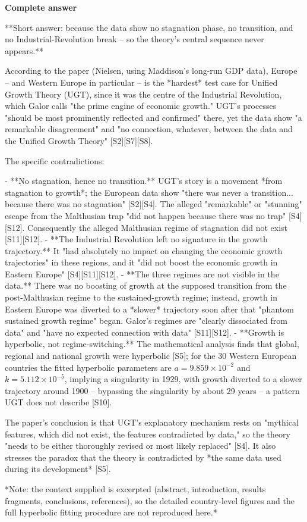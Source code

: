 \documentclass[10pt]{article}
\begin{document}
\textbf{Complete answer}
\begin{AnswerText}
**Short answer: because the data show no stagnation phase, no transition, and no Industrial-Revolution break -- so the theory's central sequence never appears.**

According to the paper (Nielsen, using Maddison's long-run GDP data), Europe -- and Western Europe in particular -- is the *hardest* test case for Unified Growth Theory (UGT), since it was the centre of the Industrial Revolution, which Galor calls "the prime engine of economic growth." UGT's processes "should be most prominently reflected and confirmed" there, yet the data show "a remarkable disagreement" and "no connection, whatever, between the data and the Unified Growth Theory" [S2][S7][S8].

The specific contradictions:

- **No stagnation, hence no transition.** UGT's story is a movement *from stagnation to growth*; the European data show "there was never a transition... because there was no stagnation" [S2][S4]. The alleged "remarkable" or "stunning" escape from the Malthusian trap "did not happen because there was no trap" [S4][S12]. Consequently the alleged Malthusian regime of stagnation did not exist [S11][S12].
- **The Industrial Revolution left no signature in the growth trajectory.** It "had absolutely no impact on changing the economic growth trajectories" in these regions, and it "did not boost the economic growth in Eastern Europe" [S4][S11][S12].
- **The three regimes are not visible in the data.** There was no boosting of growth at the supposed transition from the post-Malthusian regime to the sustained-growth regime; instead, growth in Eastern Europe was diverted to a *slower* trajectory soon after that "phantom sustained growth regime" began. Galor's regimes are "clearly dissociated from data" and "have no expected connection with data" [S11][S12].
- **Growth is hyperbolic, not regime-switching.** The mathematical analysis finds that global, regional and national growth were hyperbolic [S5]; for the 30 Western European countries the fitted hyperbolic parameters are $a = 9.859\times10^{-2}$ and $k = 5.112\times10^{-5}$, implying a singularity in 1929, with growth diverted to a slower trajectory around 1900 -- bypassing the singularity by about 29 years -- a pattern UGT does not describe [S10].

The paper's conclusion is that UGT's explanatory mechanism rests on "mythical features, which did not exist, the features contradicted by data," so the theory "needs to be either thoroughly revised or most likely replaced" [S4]. It also stresses the paradox that the theory is contradicted by *the same data used during its development* [S5].

*Note: the context supplied is excerpted (abstract, introduction, results fragments, conclusions, references), so the detailed country-level figures and the full hyperbolic fitting procedure are not reproduced here.*
\end{AnswerText}
\end{document}
